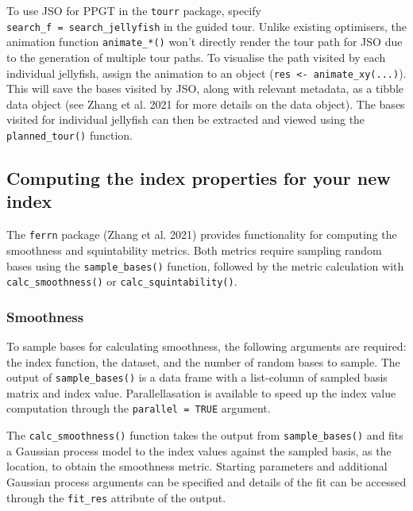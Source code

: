 \documentclass[
  12pt,
]{interact}
\theoremstyle{plain}
\begin{document}
To use JSO for PPGT in the \texttt{tourr} package, specify
\texttt{search\_f\ =\ search\_jellyfish} in the guided tour. Unlike
existing optimisers, the animation function \texttt{animate\_*()} won't
directly render the tour path for JSO due to the generation of multiple
tour paths. To visualise the path visited by each individual jellyfish,
assign the animation to an object
(\texttt{res\ \textless{}-\ animate\_xy(...)}). This will save the bases
visited by JSO, along with relevant metadata, as a tibble data object
(see Zhang et al. 2021 for more details on the data object). The bases
visited for individual jellyfish can then be extracted and viewed using
the \texttt{planned\_tour()} function.

\hypertarget{computing-the-index-properties-for-your-new-index}{%
\subsection{Computing the index properties for your new
index}\label{computing-the-index-properties-for-your-new-index}}

The \texttt{ferrn} package (Zhang et al. 2021) provides functionality
for computing the smoothness and squintability metrics. Both metrics
require sampling random bases using the \texttt{sample\_bases()}
function, followed by the metric calculation with
\texttt{calc\_smoothness()} or \texttt{calc\_squintability()}.

\hypertarget{smoothness}{%
\subsubsection{Smoothness}\label{smoothness}}

To sample bases for calculating smoothness, the following arguments are
required: the index function, the dataset, and the number of random
bases to sample. The output of \texttt{sample\_bases()} is a data frame
with a list-column of sampled basis matrix and index value.
Parallellasation is available to speed up the index value computation
through the \texttt{parallel\ =\ TRUE} argument.

The \texttt{calc\_smoothness()} function takes the output from
\texttt{sample\_bases()} and fits a Gaussian process model to the index
values against the sampled basis, as the location, to obtain the
smoothness metric. Starting parameters and additional Gaussian process
arguments can be specified and details of the fit can be accessed
through the \texttt{fit\_res} attribute of the output.
\end{document}
